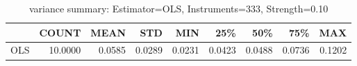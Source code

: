 \begin{table}[ht]
\centering
\caption{variance summary: Estimator=OLS, Instruments=333, Strength=0.10}
\begin{tabular}{lrrrrrrrr}
\toprule
 & COUNT & MEAN & STD & MIN & 25\% & 50\% & 75\% & MAX \\
\midrule
OLS & 10.0000 & 0.0585 & 0.0289 & 0.0231 & 0.0423 & 0.0488 & 0.0736 & 0.1202 \\
\bottomrule
\end{tabular}
\end{table}
